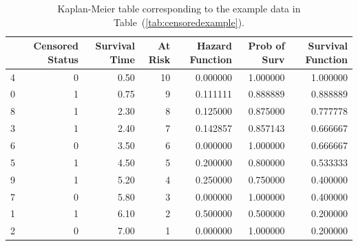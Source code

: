 \documentclass[10pt,letterpaper]{article}
\begin{document}
\begin{table}[!ht]
\begin{adjustwidth}{-2.25in}{0in} %
\caption{\label{tab:kaplanexample} Kaplan-Meier table corresponding to the example data in Table~(\ref{tab:censoredexample}).}
\begin{tabular}{lrrrrrr}
\toprule
{} &  Censored Status &  Survival Time &  At Risk &  Hazard Function &  Prob of Surv & Survival Function \\
\midrule
4 &                0 &            0.50 &              10 &       0.000000 &      1.000000 &      1.000000 \\
0 &                1 &            0.75 &               9 &       0.111111 &      0.888889 &      0.888889 \\
8 &                1 &            2.30 &               8 &       0.125000 &      0.875000 &      0.777778 \\
3 &                1 &            2.40 &               7 &       0.142857 &      0.857143 &      0.666667 \\
6 &                0 &            3.50 &               6 &       0.000000 &      1.000000 &      0.666667 \\
5 &                1 &            4.50 &               5 &       0.200000 &      0.800000 &      0.533333 \\
9 &                1 &            5.20 &               4 &       0.250000 &      0.750000 &      0.400000 \\
7 &                0 &            5.80 &               3 &       0.000000 &      1.000000 &      0.400000 \\
1 &                1 &            6.10 &               2 &       0.500000 &      0.500000 &      0.200000 \\
2 &                0 &            7.00 &               1 &       0.000000 &      1.000000 &      0.200000 \\
\bottomrule
\end{tabular}
\end{adjustwidth}
\end{table}
\end{document}
